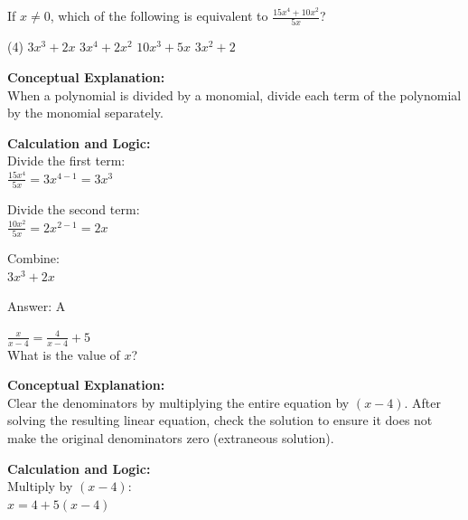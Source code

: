 \documentclass[11pt,paper=a4,answers]{exam}
\begin{document}
\begin{questions}
\vspace{40pt}

\question
If $x \neq 0$, which of the following is equivalent to $\frac{15x^4 + 10x^2}{5x}$?
\begin{tasks}(4)
    \task $3x^3 + 2x$
    \task $3x^4 + 2x^2$
    \task $10x^3 + 5x$
    \task $3x^2 + 2$
\end{tasks}

\begin{solution}
\textbf{Conceptual Explanation:} \\
When a polynomial is divided by a monomial, divide each term of the polynomial by the monomial separately.

\vspace{20pt}

\textbf{Calculation and Logic:} \\
Divide the first term: \\
$\frac{15x^4}{5x} = 3x^{4-1} = 3x^3$

\vspace{10pt}

Divide the second term: \\
$\frac{10x^2}{5x} = 2x^{2-1} = 2x$

\vspace{10pt}

Combine: \\
$3x^3 + 2x$

\vspace{25pt}

Answer: \colorbox{yellow!100}{A}
\end{solution}

\vspace{40pt}

\question
$\frac{x}{x-4} = \frac{4}{x-4} + 5$ \\
What is the value of $x$?

\begin{solution}
\textbf{Conceptual Explanation:} \\
Clear the denominators by multiplying the entire equation by $(x-4)$. After solving the resulting linear equation, check the solution to ensure it does not make the original denominators zero (extraneous solution).

\vspace{20pt}

\textbf{Calculation and Logic:} \\
Multiply by $(x-4)$: \\
$x = 4 + 5(x-4)$


\end{solution}
\end{questions}
\end{document}

